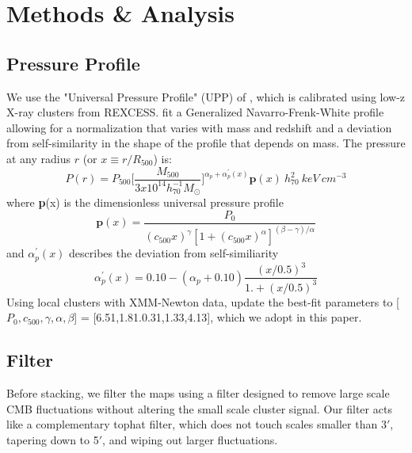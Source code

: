 \documentclass[twocolumn,iop]{emulateapj}
\begin{document}
\section{Methods \& Analysis}

\subsection{Pressure Profile}
We use the "Universal Pressure Profile" (UPP) of \cite{2010A&A...517A..92A}, which is calibrated using low-z X-ray clusters from REXCESS. \citep{2007A&A...469..363B} \citeauthor{2010A&A...517A..92A} fit a Generalized Navarro-Frenk-White profile allowing for a normalization that varies with mass and redshift and a deviation from self-similarity in the shape of the profile that depends on mass. The pressure at any radius $r$ (or $x \equiv r/R_{500}$) is:
\begin{equation}
P(r) = P_{500} \bigg[ \frac{M_{500}}{3x10^{14} h^{-1}_{70} M_{\odot}} \bigg]^{\alpha_{p} + \alpha^{\prime}_{p}(x)} \textbf{p}(x) \ h^{2}_{70} \ keV \ cm^{-3}
\end{equation}
where \textbf{p}(x) is the dimensionless universal pressure profile
\begin{equation}
\textbf{p}(x) = \frac{P_{0}}{(c_{500} x)^{\gamma} [1 + (c_{500} x)^{\alpha}]^{(\beta-\gamma)/\alpha}}
\end{equation}
and $\alpha^{\prime}_{p}(x)$ describes the deviation from self-similiarity
\begin{equation}
\alpha^{\prime}_{p}(x) = 0.10 - (\alpha_{p} + 0.10) \frac{(x/0.5)^{3}}{1. + (x/0.5)^{3}}
\end{equation}
Using local clusters with XMM-Newton data, \cite{2013A&A...550A.131P} update the best-fit parameters to [$P_{0},c_{500},\gamma,\alpha,\beta$] = [6.51,1.81.0.31,1.33,4.13], which we adopt in this paper.

\subsection{Filter}
Before stacking, we filter the maps using a filter designed to remove large scale CMB fluctuations without altering the small scale cluster signal. Our filter acts like a complementary tophat filter, which does not touch scales smaller than 3$\prime$, tapering down to 5$\prime$, and wiping out larger fluctuations.
\end{document}
